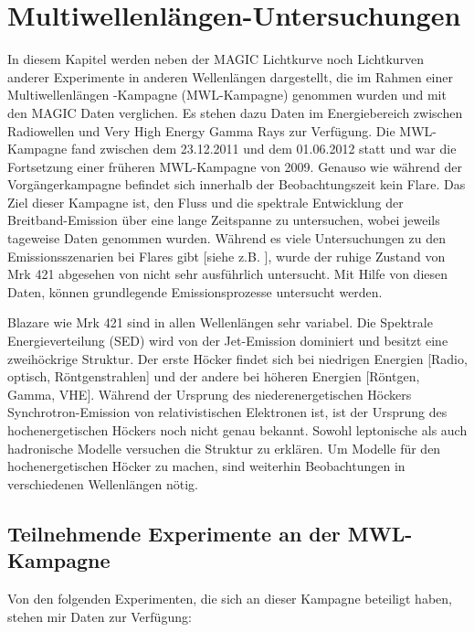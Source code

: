 \chapter{Multiwellenlängen-Untersuchungen}
\label{chapter:MWL}
In diesem Kapitel werden neben der MAGIC Lichtkurve noch Lichtkurven anderer Experimente in anderen Wellenlängen dargestellt, die im Rahmen einer Multiwellenlängen -Kampagne (MWL-Kampagne)  genommen wurden und mit den MAGIC Daten verglichen.
Es stehen dazu Daten im Energiebereich zwischen Radiowellen und Very High Energy Gamma Rays zur Verfügung.
Die MWL-Kampagne fand zwischen dem 23.12.2011 und dem 01.06.2012 statt und war die Fortsetzung einer früheren MWL-Kampagne von 2009.
Genauso wie während der Vorgängerkampagne befindet sich innerhalb der Beobachtungszeit kein Flare.
Das Ziel dieser Kampagne ist, den Fluss und die spektrale Entwicklung der Breitband-Emission über eine lange Zeitspanne zu untersuchen, wobei jeweils tageweise Daten genommen wurden.
Während es viele Untersuchungen zu den Emissionsszenarien bei Flares gibt [siehe z.B. \cite{Mrk421Flare}], wurde der ruhige Zustand von Mrk 421 abgesehen von \cite{MWL2009} nicht sehr ausführlich untersucht.
Mit Hilfe von diesen Daten, können grundlegende Emissionsprozesse untersucht werden.

Blazare wie Mrk 421 sind in allen Wellenlängen sehr variabel.
Die Spektrale Energieverteilung (SED) wird von der Jet-Emission dominiert und besitzt eine zweihöckrige Struktur.
Der erste Höcker findet sich bei niedrigen Energien [Radio, optisch, Röntgenstrahlen] und der andere bei höheren Energien [Röntgen, Gamma, VHE].
Während der Ursprung des niederenergetischen Höckers Synchrotron-Emission von relativistischen Elektronen ist, ist der Ursprung des hochenergetischen Höckers noch nicht genau bekannt.
Sowohl leptonische als auch hadronische Modelle versuchen die Struktur zu erklären.
Um Modelle für den hochenergetischen Höcker zu machen, sind weiterhin Beobachtungen in verschiedenen Wellenlängen nötig. 
 

\section{Teilnehmende Experimente an der MWL-Kampagne}
Von den folgenden Experimenten, die sich an dieser Kampagne beteiligt haben, stehen mir Daten zur Verfügung:

